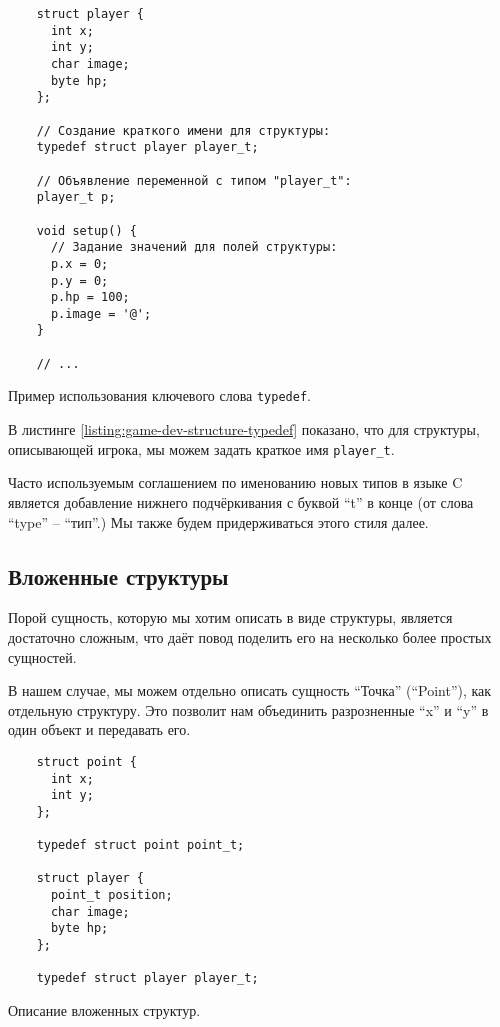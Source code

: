 \documentclass[../sparc.tex]{subfiles}
\begin{document}
\begin{listing}[H]
  \begin{verbatim}
    struct player {
      int x;
      int y;
      char image;
      byte hp;
    };

    // Создание краткого имени для структуры:
    typedef struct player player_t;

    // Объявление переменной с типом "player_t":
    player_t p;

    void setup() {
      // Задание значений для полей структуры:
      p.x = 0;
      p.y = 0;
      p.hp = 100;
      p.image = '@';
    }

    // ...
  \end{verbatim}
  \caption{Пример использования ключевого слова  \texttt{typedef}.}
  \label{listing:game-dev-structure-typedef}
\end{listing}

В листинге \ref{listing:game-dev-structure-typedef} показано, что для структуры,
описывающей игрока, мы можем задать краткое имя \texttt{player_t}.

Часто используемым соглашением по именованию новых типов в языке C является
добавление нижнего подчёркивания с буквой ``t'' в конце (от слова ``type'' --
``тип''.)  Мы также будем придерживаться этого стиля далее.

\subsection{Вложенные структуры}

Порой сущность, которую мы хотим описать в виде структуры, является достаточно
сложным, что даёт повод поделить его на несколько более простых сущностей.

В нашем случае, мы можем отдельно описать сущность ``Точка'' (``Point''), как
отдельную структуру.  Это позволит нам объединить разрозненные ``x'' и ``y'' в
один объект и передавать его.

\begin{listing}[H]
  \begin{verbatim}
    struct point {
      int x;
      int y;
    };

    typedef struct point point_t;

    struct player {
      point_t position;
      char image;
      byte hp;
    };

    typedef struct player player_t;
  \end{verbatim}
  \caption{Описание вложенных структур.}
  \label{listing:game-dev-nested-structures}
\end{listing}
\end{document}
